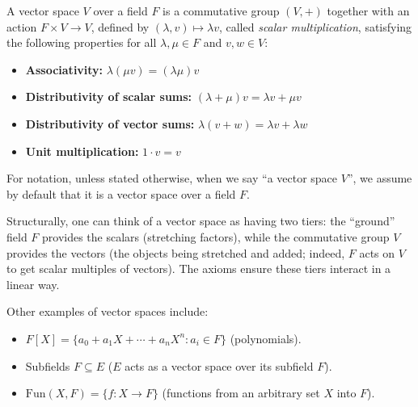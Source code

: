 \documentclass[../linear_algebra_and_groups.tex]{subfiles}
\begin{document}
\begin{definition}
    \begin{shaded*}
        A vector space $V$ over a field $F$ is a commutative group $(V,+)$ together with an action $F\times V\to V$, defined by $(\lambda,v)\mapsto\lambda v$, called \textit{scalar multiplication}, satisfying the following properties for all $\lambda,\mu\in F$ and $v,w\in V$:
        \begin{itemize}
            \item \textbf{Associativity:} $\lambda(\mu v)=(\lambda\mu)v$
            \item \textbf{Distributivity of scalar sums:} $(\lambda+\mu)v=\lambda v+\mu v$
            \item \textbf{Distributivity of vector sums:} $\lambda(v+w)=\lambda v+\lambda w$
            \item \textbf{Unit multiplication:} $1\cdot v=v$
        \end{itemize}
    \end{shaded*}
\end{definition}
For notation, unless stated otherwise, when we say ``a vector space $V$'', we assume by default that it is a vector space over a field $F$.

\begin{remark}
    Structurally, one can think of a vector space as having two tiers: the ``ground'' field $F$ provides the scalars (stretching factors), while the commutative group $V$ provides the vectors (the objects being stretched and added; indeed, $F$ acts on $V$ to get scalar multiples of vectors). The axioms ensure these tiers interact in a linear way.
\end{remark}

\begin{example}
    Other examples of vector spaces include:
    \begin{itemize}
        \item $F[X]=\{a_0+a_1X+\cdots+a_nX^n:a_i\in F\}$ (polynomials).
        \item Subfields $F\subseteq E$ ($E$ acts as a vector space over its subfield $F$).
        \item $\text{Fun}(X,F)=\{f:X\to F\}$ (functions from an arbitrary set $X$ into $F$).
    \end{itemize}
\end{example}
\end{document}
